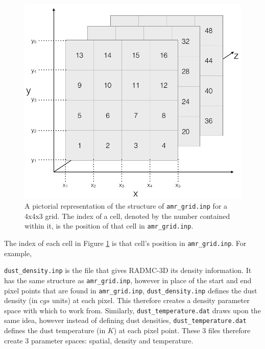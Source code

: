 \documentclass{report}
\begin{document}
\begin{figure}[h]
  \centering
  \includegraphics[scale=0.5]{../img/amr_grid_structure}
  \caption[A pictorial representation of the structure of \texttt{amr\_grid.inp} for a 4x4x3 grid. The index of a cell, denoted by the number contained within it, is the position of that cell in \texttt{amr\_grid.inp}.]{A pictorial representation of the structure of \texttt{amr\_grid.inp} for a 4x4x3 grid. The index of a cell, denoted by the number contained within it, is the position of that cell in \texttt{amr\_grid.inp}.}
  \label{fig:amr_grid_structure}
\end{figure}

The index of each cell in Figure \ref{fig:amr_grid_structure} is that cell's position in \texttt{amr\_grid.inp}. For example,

\texttt{dust\_density.inp} is the file that gives RADMC-3D its density information. It has the same structure as \texttt{amr\_grid.inp}, however in place of the start and end pixel points that are found in \texttt{amr\_grid.inp}, \texttt{dust\_density.inp} defines the dust density (in $cgs$ units) at each pixel. This therefore creates a density parameter space with which to work from. Similarly, \texttt{dust\_temperature.dat} draws upon the same idea, however instead of defining dust densities, \texttt{dust\_temperature.dat} defines the dust temperature (in $K$) at each pixel point. These 3 files therefore create 3 parameter spaces: spatial, density and temperature.
\end{document}
